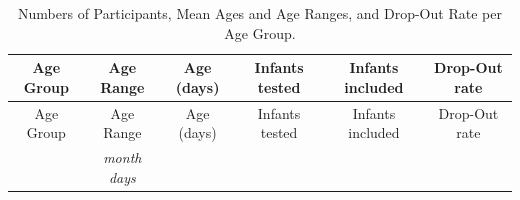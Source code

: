 \documentclass[openright,titlepage,12pt,a4paper]{book}
\begin{document}
\begin{longtable}[]{@{}cccccc@{}}
\caption{\label{tab:ch04tab1} Numbers of Participants, Mean Ages and Age Ranges, and Drop-Out Rate per Age Group.}\tabularnewline
\toprule
\begin{minipage}[b]{0.09\columnwidth}\centering
Age Group\strut
\end{minipage} & \begin{minipage}[b]{0.16\columnwidth}\centering
Age Range\strut
\end{minipage} & \begin{minipage}[b]{0.17\columnwidth}\centering
Age (days)\strut
\end{minipage} & \begin{minipage}[b]{0.12\columnwidth}\centering
Infants tested\strut
\end{minipage} & \begin{minipage}[b]{0.14\columnwidth}\centering
Infants included\strut
\end{minipage} & \begin{minipage}[b]{0.14\columnwidth}\centering
Drop-Out rate\strut
\end{minipage}\tabularnewline
\midrule
\endfirsthead
\toprule
\begin{minipage}[b]{0.09\columnwidth}\centering
Age Group\strut
\end{minipage} & \begin{minipage}[b]{0.16\columnwidth}\centering
Age Range\strut
\end{minipage} & \begin{minipage}[b]{0.17\columnwidth}\centering
Age (days)\strut
\end{minipage} & \begin{minipage}[b]{0.12\columnwidth}\centering
Infants tested\strut
\end{minipage} & \begin{minipage}[b]{0.14\columnwidth}\centering
Infants included\strut
\end{minipage} & \begin{minipage}[b]{0.14\columnwidth}\centering
Drop-Out rate\strut
\end{minipage}\tabularnewline
\midrule
\endhead
\begin{minipage}[t]{0.09\columnwidth}\centering
\strut
\end{minipage} & \begin{minipage}[t]{0.16\columnwidth}\centering
\emph{month days}\strut
\end{minipage} & \begin{minipage}[t]{0.17\columnwidth}\centering

\end{minipage}
\end{longtable}
\end{document}
